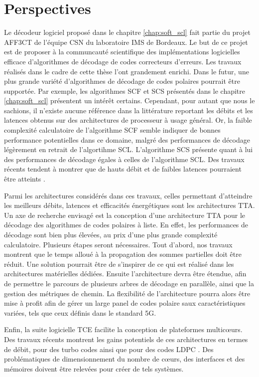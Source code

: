 \section*{Perspectives}

Le décodeur logiciel proposé dans le chapitre \ref{chap:soft_scl} fait partie du projet AFF3CT de l'équipe CSN du laboratoire IMS de Bordeaux. Le but de ce projet est de proposer à la communcauté scientifique des implémentations logicielles efficace d'algorithmes de décodage de codes correcteurs d'erreurs. Les travaux réalisés dans le cadre de cette thèse l'ont grandement enrichi. Dans le futur, une plus grande variété d'algorithmes de décodage de codes polaires pourrait être supportée. Par exemple, les algorithmes SCF et SCS présentés dans le chapitre \ref{chap:soft_scl} présentent un intérêt certains. Cependant, pour autant que nous le sachions, il n'existe aucune référence dans la littérature reportant les débits et les latences obtenus sur des architectures de processeur à usage général. Or, la faible complexité calculatoire de l'algorithme SCF semble indiquer de bonnes performance potentielles dans ce domaine, malgré des performances de décodage légèrement en retrait de l'algortihme SCL. L'algorithme SCS présente quant à lui des performances de décodage égales à celles de l'algorithme SCL. Des travaux récents tendent à montrer que de hauts débit et de faibles latences pourraient être atteints \cite{8351832}.

Parmi les architectures considérés dans ces travaux, celles permettant d'atteindre les meilleurs débits, latences et efficacités énergétiques sont les architectures TTA. Un axe de recherche envisagé est la conception d'une architecture TTA pour le décodage des algorithmes de codes polaires à liste. En effet, les performances de décodage sont bien plus élevées, au prix d'une plus grande complexité calculatoire. Plusieurs étapes seront nécessaires. Tout d'abord, nos travaux montrent que le temps alloué à la propagation des sommes partielles doit être réduit. Une solution pourrait être de s'inspirer de ce qui est réalisé dans les architectures matérielles dédiées. Ensuite l'architecture devra être étendue, afin de permettre le parcours de plusieurs arbres de décodage en parallèle, ainsi que la gestion des métriques de chemin. La flexibilité de l'architecture pourra alors être mise à profit afin de gérer un large panel de codes polaire saux caractéristiques variées, tels que ceux définis dans le standard 5G.

Enfin, la suite logicielle TCE facilite la conception de plateformes multicœurs. Des travaux récents montrent les gains potentiels de ces architectures en termes de débit, pour des turbo codes ainsi que pour des codes LDPC \cite{}. Des problématiques de dimensionnement du nombre de cœurs, des interfaces et des mémoires doivent être relevées pour créer de tels systèmes.